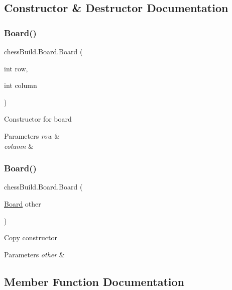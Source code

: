 \subsection{Constructor \& Destructor Documentation}
\mbox{\label{classchess_build_1_1_board_a41548dc02b3082c7a8f93a02919ec564}} 
\subsubsection{\texorpdfstring{Board()}{Board()}\hspace{0.1cm}{\footnotesize\ttfamily [1/2]}}
{\footnotesize\ttfamily chess\+Build.\+Board.\+Board (\begin{DoxyParamCaption}\item[{int}]{row,  }\item[{int}]{column }\end{DoxyParamCaption})}

Constructor for board 
\begin{DoxyParams}{Parameters}
{\em row} & \\
\hline
{\em column} & \\
\hline
\end{DoxyParams}
\mbox{\label{classchess_build_1_1_board_a07018ac4fd8680cf86449f9446f81e9d}} 
\subsubsection{\texorpdfstring{Board()}{Board()}\hspace{0.1cm}{\footnotesize\ttfamily [2/2]}}
{\footnotesize\ttfamily chess\+Build.\+Board.\+Board (\begin{DoxyParamCaption}\item[{\hyperlink{classchess_build_1_1_board}{Board}}]{other }\end{DoxyParamCaption})}

Copy constructor 
\begin{DoxyParams}{Parameters}
{\em other} & \\
\hline
\end{DoxyParams}


\subsection{Member Function Documentation}
\mbox{\label{classchess_build_1_1_board_ac58d9824c7dc8ee3449896ae38802f22}} 
